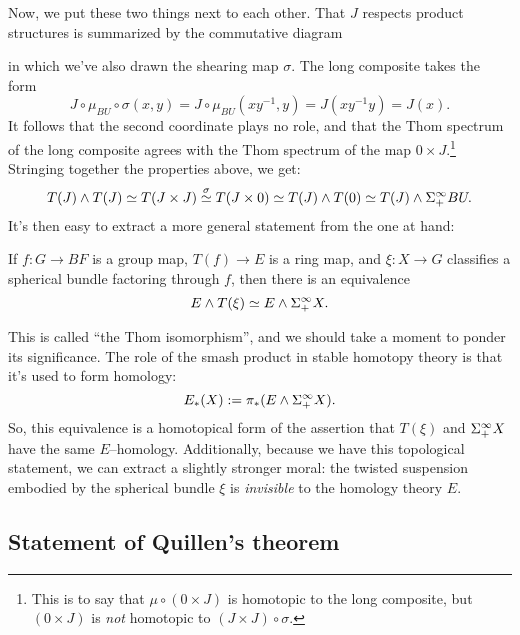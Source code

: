 Now, we put these two things next to each other.  That $J$ respects product structures is summarized by the commutative diagram
\begin{center}
\end{center}
in which we've also drawn the shearing map $\sigma$.  The long composite takes the form \[J \circ \mu_{BU} \circ \sigma (x, y) = J \circ \mu_{BU} (x y^{-1}, y) = J(x y^{-1} y) = J(x).\]  It follows that the second coordinate plays no role, and that the Thom spectrum of the long composite agrees with the Thom spectrum of the map $0 \times J$.\footnote{This is to say that $\mu \circ (0 \times J)$ is homotopic to the long composite, but $(0 \times J)$ is \emph{not} homotopic to $(J \times J) \circ \sigma$.}  Stringing together the properties above, we get: \[T(J) \wedge T(J) \simeq T(J \times J) \stackrel{\sigma}{\simeq} T(J \times 0) \simeq T(J) \wedge T(0) \simeq T(J) \wedge \Sigma^\infty_+ BU.\]  It's then easy to extract a more general statement from the one at hand:
\begin{theorem}
If $f: G \to BF$ is a group map, $T(f) \to E$ is a ring map, and $\xi: X \to G$ classifies a spherical bundle factoring through $f$, then there is an equivalence \[E \wedge T(\xi) \simeq E \wedge \Sigma^\infty_+ X.\]
\end{theorem}

This is called ``the Thom isomorphism'', and we should take a moment to ponder its significance.  The role of the smash product in stable homotopy theory is that it's used to form homology: \[E_*(X) := \pi_*(E \wedge \Sigma^\infty_+ X).\]  So, this equivalence is a homotopical form of the assertion that $T(\xi)$ and $\Sigma^\infty_+ X$ have the same $E$--homology.  Additionally, because we have this topological statement, we can extract a slightly stronger moral: the twisted suspension embodied by the spherical bundle $\xi$ is \emph{invisible} to the homology theory $E$.



\subsection{Statement of Quillen's theorem}

